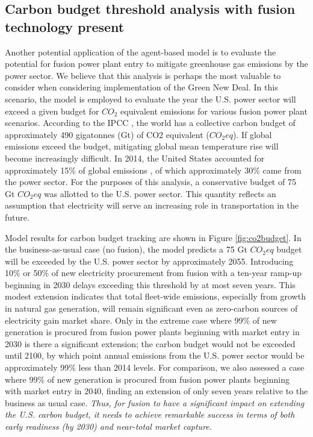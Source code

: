 \documentclass[review]{elsarticle}
\begin{document}
\subsection{Carbon budget threshold analysis with fusion technology present}

Another potential application of the agent-based model is to evaluate the potential for fusion power plant entry to mitigate greenhouse gas emissions by the power sector. We believe that this analysis is perhaps the most valuable to consider when considering implementation of the Green New Deal. In this scenario, the model is employed to evaluate the year the U.S. power sector will exceed a given budget for $CO_2$ equivalent emissions for various fusion power plant scenarios. According to the IPCC \citep{IPCC2014}, the world has a collective carbon budget of approximately 490 gigatonnes (Gt) of CO2 equivalent ($CO_2eq$). If global emissions exceed the budget, mitigating global mean temperature rise will become increasingly difficult. In 2014, the United States accounted for approximately 15\% of global emissions \citep{Boden2017}, of which approximately 30\% \citep{EPA2017} came from the power sector. For the purposes of this analysis, a conservative budget of 75 Gt $CO_2eq$ was allotted to the U.S. power sector. This quantity reflects an assumption that electricity will serve an increasing role in transportation in the future.

Model results for carbon budget tracking are shown in Figure \ref{fig:co2budget}. In the business-as-usual case (no fusion), the model predicts a 75 Gt $CO_2eq$ budget will be exceeded by the U.S. power sector by approximately 2055. Introducing 10\% or 50\% of new electricity procurement from fusion with a ten-year ramp-up beginning in 2030 delays exceeding this threshold by at most seven years. This modest extension indicates that total fleet-wide emissions, especially from growth in natural gas generation, will remain significant even as zero-carbon sources of electricity gain market share. Only in the extreme case where 99\% of new generation is procured from fusion power plants beginning with market entry in 2030 is there a significant extension; the carbon budget would not be exceeded until 2100, by which point annual emissions from the U.S. power sector would be approximately 99\% less than 2014 levels. For comparison, we also assessed a case where 99\% of new generation is procured from fusion power plants beginning with market entry in 2040, finding an extension of only seven years relative to the business as usual case. \emph{Thus, for fusion to have a significant impact on extending the U.S. carbon budget, it needs to achieve remarkable success in terms of both early readiness (by 2030) and near-total market capture.}
\end{document}
